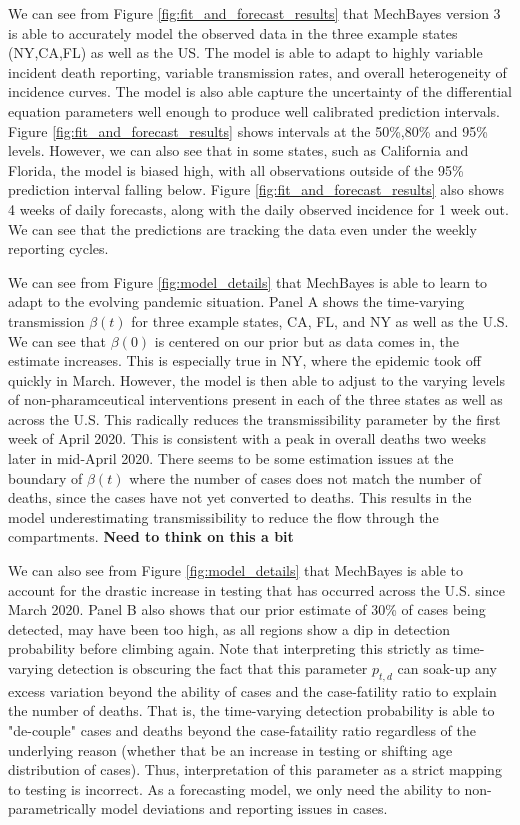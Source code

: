 \documentclass[11pt]{amsart}
\begin{document}
We can see from Figure \ref{fig:fit_and_forecast_results} that MechBayes version 3 is able to accurately model the observed data in the three example states (NY,CA,FL) as well as the US. The model is able to adapt to highly variable incident death reporting, variable transmission rates, and overall heterogeneity of incidence curves. The model is also able capture the uncertainty of the differential equation parameters well enough to produce well calibrated prediction intervals. Figure \ref{fig:fit_and_forecast_results}  shows intervals at the 50\%,80\% and 95\% levels. However, we can also see that in some states, such as California and Florida, the model is biased high, with all observations outside of the 95\% prediction interval falling below. Figure \ref{fig:fit_and_forecast_results}  also shows 4 weeks of daily forecasts, along with the daily observed incidence for 1 week out. We can see that the predictions are tracking the data even under the weekly reporting cycles. 

We can see from Figure \ref{fig:model_details} that MechBayes is able to learn to adapt to the evolving pandemic situation. Panel A shows the time-varying transmission $\beta(t)$ for three example states, CA, FL, and NY as well as the U.S. We can see that $\beta(0)$ is centered on our prior but as data comes in, the estimate increases. This is especially true in NY, where the epidemic took off quickly in March. However, the model is then able to adjust to the varying levels of non-pharamceutical interventions present in each of the three states as well as across the U.S. This radically reduces the transmissibility parameter by the first week of April 2020. This is consistent with a peak in overall deaths two weeks later in mid-April 2020. There seems to be some estimation issues at the boundary of $\beta(t)$ where the number of cases does not match the number of deaths, since the cases have not yet converted to deaths. This results in the model underestimating transmissibility to reduce the flow through the compartments. \textbf{Need to think on this a bit}

We can also see from Figure \ref{fig:model_details}  that MechBayes is able to account for the drastic increase in testing that has occurred across the U.S. since March 2020. Panel B also shows that our prior estimate of 30\% of cases being detected, may have been too high, as all regions show a dip in detection probability before climbing again. Note that interpreting this strictly as time-varying detection is obscuring the fact that this parameter $p_{t,d}$ can soak-up any excess variation beyond the ability of cases and the case-fatility ratio to explain the number of deaths. That is, the time-varying detection probability is able to "de-couple" cases and deaths beyond the case-fataility ratio regardless of the underlying reason (whether that be an increase in testing or shifting age distribution of cases). Thus, interpretation of this parameter as a strict mapping to testing is incorrect. As a forecasting model, we only need the ability to non-parametrically model deviations and reporting issues in cases.
\end{document}
